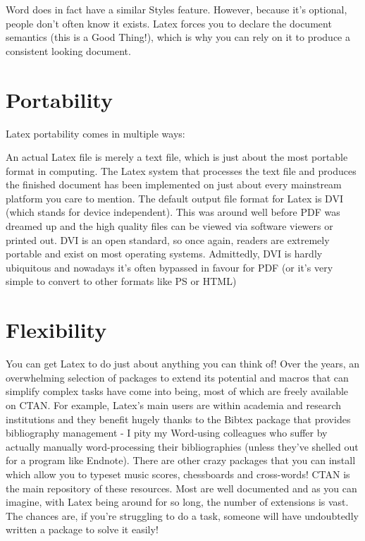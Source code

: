 Word does in fact have a similar Styles feature. However, because it's optional, people don't often know it exists. Latex forces you to declare the document semantics (this is a Good Thing!), which is why you can rely on it to produce a consistent looking document.

\section{Portability}

Latex portability comes in multiple ways:

An actual Latex file is merely a text file, which is just about the most portable format in computing.
The Latex system that processes the text file and produces the finished document has been implemented on just about every mainstream platform you care to mention.
The default output file format for Latex is DVI (which stands for device independent). This was around well before PDF was dreamed up and the high quality files can be viewed via software viewers or printed out. DVI is an open standard, so once again, readers are extremely portable and exist on most operating systems. Admittedly, DVI is hardly ubiquitous and nowadays it's often bypassed in favour for PDF (or it's very simple to convert to other formats like PS or HTML)

\section{Flexibility}
You can get Latex to do just about anything you can think of! Over the years, an overwhelming selection of packages to extend its potential and macros that can simplify complex tasks have come into being, most of which are freely available on CTAN. For example, Latex's main users are within academia and research institutions and they benefit hugely thanks to the Bibtex package that provides bibliography management - I pity my Word-using colleagues who suffer by actually manually word-processing their bibliographies (unless they've shelled out for a program like Endnote). There are other crazy packages that you can install which allow you to typeset music scores, chessboards and cross-words! CTAN is the main repository of these resources. Most are well documented and as you can imagine, with Latex being around for so long, the number of extensions is vast. The chances are, if you're struggling to do a task, someone will have undoubtedly written a package to solve it easily!

